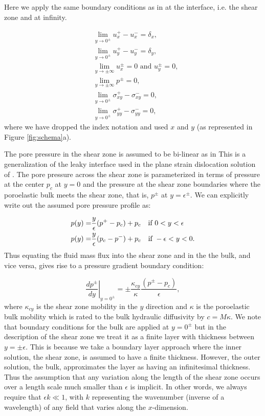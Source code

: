 \documentclass[draft]{agujournal2019}
\begin{document}
Here we apply the same boundary conditions as in \cite{Heimisson2021} at the interface, i.e. the shear zone and at infinity.

\begin{align}
& \lim_{y \rightarrow 0^\pm} u^+_x - u^-_x = \delta_x, \\
& \lim_{y \rightarrow 0^\pm} u^+_y - u^-_y = \delta_y, \\
& \lim_{y \rightarrow \pm \infty} u^\pm_x = 0 \text{ and } u^\pm_y = 0 , \\
& \lim_{y \rightarrow \pm \infty} p^\pm = 0, \\
& \lim_{y \rightarrow 0^\pm} \sigma^+_{xy} - \sigma^-_{xy} = 0, \\
& \lim_{y \rightarrow 0^\pm} \sigma^+_{yy} - \sigma^-_{yy} = 0,
\end{align}
where we have dropped the index notation and used $x$ and $y$ (as represented in Figure \ref{fig:schema}a).

The pore pressure in the shear zone is assumed to be bi-linear as in  This is a generalization of the leaky interface used in the plane strain dislocation solution of . The pore pressure across the shear zone is parameterized in terms of pressure at the center $p_c$ at $y=0$ and the pressure at the shear zone boundaries where the poroelastic bulk meets the shear zone, that is, $p^\pm$ at $y = \epsilon^\pm$. We can explicitly write out the assumed pore pressure profile as:

\begin{align}
    p(y) = & \frac{y}{\epsilon}(p^+ - p_c) + p_c \text{\quad if } 0 < y < \epsilon \nonumber \\ 
    p(y) = & \frac{y}{\epsilon}(p_c - p^-) + p_c \text{\quad if } - \epsilon < y < 0 .
    \label{eq:linear}
\end{align}
Thus equating the fluid mass flux into the shear zone and in the the bulk, and vice versa, gives rise to a pressure gradient boundary condition:

\begin{equation}
 \left. \frac{d p^\pm}{d y} \right|_{y = 0^\pm} = \pm \frac{\kappa_{cy}}{\kappa} \frac{(p^\pm - p_c)}{\epsilon},
 \label{eq:BC}
\end{equation}
where $\kappa_{cy}$ is the shear zone mobility in the $y$ direction and $\kappa$ is the poroelastic bulk mobility which is rated to the bulk hydraulic diffusivity by $c = M\kappa$. We note that boundary conditions for the bulk are applied at $y = 0^\pm$ but in the description of the shear zone we treat it as a finite layer with thickness between $y = \pm \epsilon$. This is because we take a boundary layer approach \cite<similar to Appedix B of>{Rudnicki2006} where the inner solution, the shear zone, is assumed to have a finite thickness. However, the outer solution, the bulk, approximates the layer as having an infinitesimal thickness. Thus the assumption that any variation along the length of the shear zone occurs over a length scale much smaller than $\epsilon$ is implicit. In other words, we always require that $\epsilon k \ll 1$, with $k$ representing the wavenumber (inverse of a wavelength) of any field that varies along the $x$-dimension.
\end{document}
